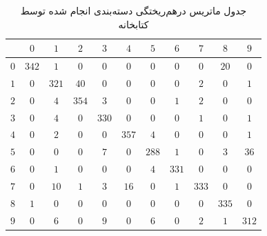 \documentclass{article}
\begin{document}
\begin{table}[h]
    \centering
    \caption{جدول ماتریس درهم‌ریختگی دسته‌بندی انجام شده توسط کتابخانه }
    \label{xgboost}
    \begin{tabular}{c||c|c|c|c|c|c|c|c|c|c}
    & $0$ & $1$ & $2$ & $3$ & $4$ & $5$ & $6$ & $7$ & $8$ & $9$ \\
    \hline\hline
    $0$ & $342$ & $1$ & $0$ & $0$ & $0$ & $0$ & $0$ & $0$ & $20$ & $0$ \\
    \hline
    $1$ & $0$ & $321$ & $40$ & $0$ & $0$ & $0$ & $0$ & $2$ & $0$ & $1$ \\
    \hline
    $2$ & $0$ & $4$ & $354$ & $3$ & $0$ & $0$ & $1$ & $2$ & $0$ & $0$ \\
    \hline
    $3$ & $0$ & $4$ & $0$ & $330$ & $0$ & $0$ & $0$ & $1$ & $0$ & $1$ \\
    \hline
    $4$ & $0$ & $2$ & $0$ & $0$ & $357$ & $4$ & $0$ & $0$ & $0$ & $1$ \\
    \hline
    $5$ & $0$ & $0$ & $0$ & $7$ & $0$ & $288$ & $1$ & $0$ & $3$ & $36$ \\
    \hline
    $6$ & $0$ & $1$ & $0$ & $0$ & $0$ & $4$ & $331$ & $0$ & $0$ & $0$ \\
    \hline
    $7$ & $0$ & $10$ & $1$ & $3$ & $16$ & $0$ & $1$ & $333$ & $0$ & $0$ \\
    \hline
    $8$ & $1$ & $0$ & $0$ & $0$ & $0$ & $0$ & $0$ & $0$ & $335$ & $0$ \\
    \hline
    $9$ & $0$ & $6$ & $0$ & $9$ & $0$ & $6$ & $0$ & $2$ & $1$ & $312$
    \end{tabular}
\end{table}


\newpage
\end{document}
